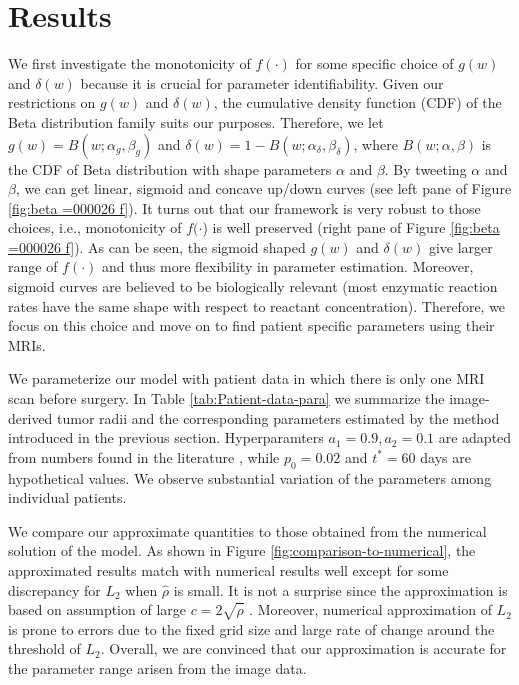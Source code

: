 \documentclass{aims}
\numberwithin{equation}{section}
\begin{document}
\section{Results}

We first investigate the monotonicity of $f(\cdot)$ for some specific
choice of $g(w)$ and $\delta(w)$ because it is crucial for parameter
identifiability. Given our restrictions on $g(w)$ and $\delta(w)$,
the cumulative density function (CDF) of the Beta distribution family
suits our purposes.  Therefore, we let $g(w)=B(w;\alpha_g,\beta_g)$ and $\delta(w)=1-B(w;\alpha_{\delta},\beta_{\delta})$, where $B(w; \alpha, \beta)$ is the CDF of Beta distribution with shape parameters $\alpha$ and $\beta$. By tweeting $\alpha$ and $\beta$, we can get linear, sigmoid and concave
up/down curves (see left pane of Figure \ref{fig:beta =000026 f}).
It turns out that our framework is very robust to those choices, i.e.,
monotonicity of $f(\cdot$) is well preserved (right pane of Figure
\ref{fig:beta =000026 f}). As can be seen, the sigmoid shaped $g(w)$
and $\delta(w)$ give larger range of $f(\cdot)$ and thus more flexibility
in parameter estimation. Moreover, sigmoid curves are believed to
be biologically relevant (most enzymatic reaction rates have the same
shape with respect to reactant concentration). Therefore, we focus
on this choice and move on to find patient specific parameters using
their MRIs.


We parameterize our model with patient data in which there is only
one MRI scan before surgery. In Table \ref{tab:Patient-data-para}
we summarize the image-derived tumor radii and the corresponding parameters
estimated by the method introduced in the previous section. Hyperparamters $a_1=0.9, a_2=0.1$ are  adapted from numbers found in the literature \cite{Swanson2008}, while $p_0=0.02$  and $t^*=60$ days are hypothetical values. We observe
substantial variation of the parameters among individual patients. 

We compare our approximate quantities to those obtained from the numerical
solution of the model. As shown in Figure \ref{fig:comparison-to-numerical},
the approximated results match with numerical results well except
for some discrepancy for $L_{2}$ when $\hat{\rho}$ is small. It
is not a surprise since the approximation is based on assumption of
large $c=2\sqrt{\hat{\rho}}$ . Moreover, numerical approximation
of $L_{2}$ is prone to errors due to the fixed grid size and large
rate of change around the threshold of $L_{2}$. Overall, we are convinced
that our approximation is accurate for the parameter range arisen
from the image data.
\end{document}
